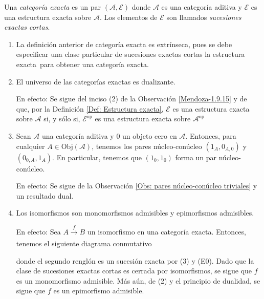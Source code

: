 \documentclass[tesis]{subfiles}
\begin{document}
\begin{Def}\label{Def: Categoría exacta}
    Una \emph{categoría exacta} es un par $(\mathscr{A},\mathscr{E})$ donde $\mathscr{A}$ es una categoría aditiva y $\mathscr{E}$ es una estructura exacta sobre $\mathscr{A}$. Los elementos de $\mathscr{E}$ son llamados \emph{sucesiones exactas cortas}.
\end{Def}

\begin{Obs}\label{Bühler-2.2-2.8}\leavevmode
    \begin{enumerate}[label=(\arabic*)]

        \item La definición anterior de categoría exacta es extrínseca, pues se debe especificar una clase particular de sucesiones exactas cortas \textemdash la estructura exacta\textemdash \ para obtener una categoría exacta.
    
        \item El universo de las categorías exactas es dualizante.

        En efecto: Se sigue del inciso (2) de la Observación \ref{Mendoza-1.9.15} y de que, por la Definición \ref{Def: Estructura exacta}, $\mathscr{E}$ es una estructura exacta sobre $\mathscr{A}$ si, y sólo si, $\mathscr{E}^\text{op}$ es una estructura exacta sobre $\mathscr{A}^\text{op}$

        \item Sean $\mathscr{A}$ una categoría aditiva y $0$ un objeto cero en $\mathscr{A}$. Entonces, para cualquier $A\in\text{Obj}(\mathscr{A})$, tenemos los pares núcleo-conúcleo $(1_A,0_{A,0})$ y $(0_{0,A},1_A)$. En particular, tenemos que $(1_0,1_0)$ forma un par núcleo-conúcleo.

            En efecto: Se sigue de la Observación \ref{Obs: pares núcleo-conúcleo triviales} y un resultado dual. %

        \item Los isomorfismos son monomorfismos admisibles y epimorfismos admisibles. 

            En efecto: Sea $A\xrightarrow[]{f} B$ un isomorfismo en una categoría exacta. Entonces, tenemos el siguiente diagrama conmutativo
    \begin{center}
    \end{center}
    donde el segundo renglón es un sucesión exacta por (3) y (E0). Dado que la clase de sucesiones exactas cortas es cerrada por isomorfismos, se sigue que $f$ es un monomorfismo admisible. Más aún, de (2) y el principio de dualidad, se sigue que $f$ es un epimorfismo admisible.


\end{enumerate}
\end{Obs}
\end{document}
